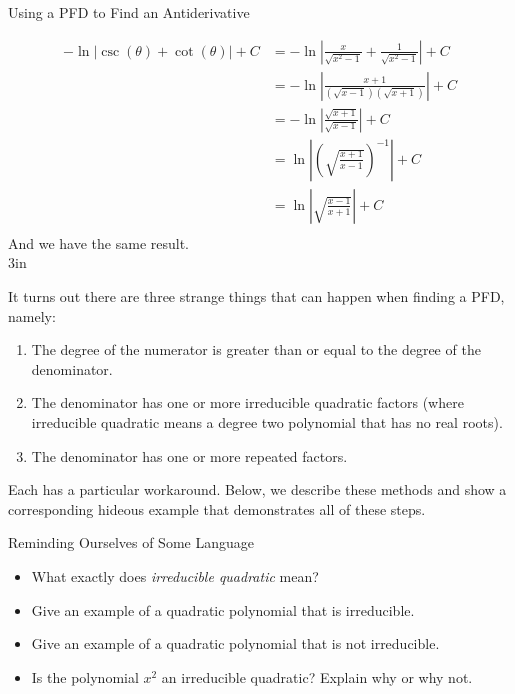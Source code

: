 \begin{exercise}{Using a PFD to Find an Antiderivative \Coffeecup \Coffeecup }
\begin{itemize}
{\begin{align*}
-\ln|\csc(\theta)+\cot(\theta)|+C&=-\ln\left|\frac{x}{\sqrt{x^2-1}}+\frac{1}{\sqrt{x^2-1}}\right|+C\\
&=-\ln\left|\frac{x+1}{(\sqrt{x-1})(\sqrt{x+1})}
\right|+C\\
&=-\ln\left|\frac{\sqrt{x+1}}{\sqrt{x-1}}\right|+C\\
&=\ln\left|\left(\sqrt{\frac{x+1}{x-1}}\right)^{-1}\right|+C\\
&=\ln\left|\sqrt{\frac{x-1}{x+1}}\right|+C\\
\end{align*}
And we have the same result.\\
}{3in}
\end{itemize}
\end{exercise}
It turns out there are three strange things that can happen when finding a PFD, namely: 
\begin{enumerate}
\item The degree of the numerator is greater than or equal to the degree of the denominator. 
\item The denominator has one or more irreducible quadratic factors (where irreducible quadratic means a degree two polynomial that has no real roots).
\item The denominator has one or more repeated factors.
\end{enumerate}

Each has a particular workaround.  Below, we describe these methods and show a corresponding hideous example that demonstrates all of these steps.  

\begin{exercise}{Reminding Ourselves of Some Language \Coffeecup}
\begin{itemize}
\item What exactly does \emph{irreducible quadratic} mean?
\item Give an example of a quadratic polynomial that is irreducible.
\item Give an example of a quadratic polynomial that is not irreducible.
\item Is the polynomial $x^2$ an irreducible quadratic?  Explain why or why not.
\vspace*{.5in}
\end{itemize}
\end{exercise}


